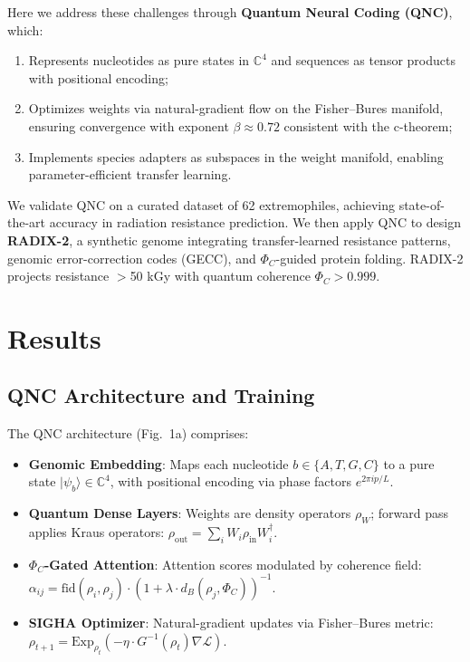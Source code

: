 \documentclass[final,lineno]{nature}
\begin{document}
Here we address these challenges through \textbf{Quantum Neural Coding (QNC)}, which:
\begin{enumerate}
    \item Represents nucleotides as pure states in $\mathbb{C}^4$ and sequences as tensor products with positional encoding;
    \item Optimizes weights via natural-gradient flow on the Fisher--Bures manifold, ensuring convergence with exponent $\beta \approx 0.72$ consistent with the c-theorem\cite{zamolodchikov1986};
    \item Implements species adapters as subspaces in the weight manifold, enabling parameter-efficient transfer learning.
\end{enumerate}

We validate QNC on a curated dataset of 62 extremophiles, achieving state-of-the-art accuracy in radiation resistance prediction. We then apply QNC to design \textbf{RADIX-2}, a synthetic genome integrating transfer-learned resistance patterns, genomic error-correction codes (GECC), and $\Phi_C$-guided protein folding. RADIX-2 projects resistance $>$50 kGy with quantum coherence $\Phi_C > 0.999$.

\section{Results}

\subsection{QNC Architecture and Training}
The QNC architecture (Fig.~1a) comprises:
\begin{itemize}
    \item \textbf{Genomic Embedding}: Maps each nucleotide $b \in \{A,T,G,C\}$ to a pure state $|\psi_b\rangle \in \mathbb{C}^4$, with positional encoding via phase factors $e^{2\pi i p/L}$.
    \item \textbf{Quantum Dense Layers}: Weights are density operators $\rho_W$; forward pass applies Kraus operators: $\rho_{\text{out}} = \sum_i W_i \rho_{\text{in}} W_i^\dagger$.
    \item \textbf{$\Phi_C$-Gated Attention}: Attention scores modulated by coherence field: $\alpha_{ij} = \text{fid}(\rho_i,\rho_j) \cdot (1 + \lambda \cdot d_B(\rho_j, \Phi_C))^{-1}$.
    \item \textbf{SIGHA Optimizer}: Natural-gradient updates via Fisher--Bures metric: $\rho_{t+1} = \text{Exp}_{\rho_t}(-\eta \cdot G^{-1}(\rho_t) \nabla \mathcal{L})$.
\end{itemize}
\end{document}

